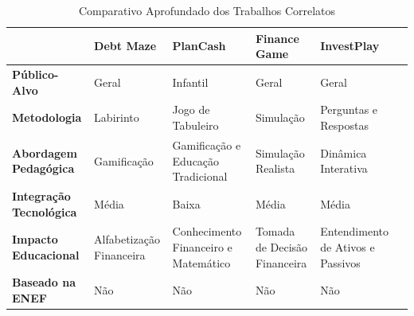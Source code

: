 \begin{table}[ht]
	\centering
	\renewcommand{\arraystretch}{1.3}
	\caption{Comparativo Aprofundado dos Trabalhos Correlatos}
	\label{tab:comparativo-trabalhos}
	\begin{tabular}{| L{2.5cm} | L{2.6cm} | L{2.6cm} | L{2.6cm} | L{2.6cm} | L{2.6cm} |}
		\hline
		\textbf{}                       & \textbf{Debt Maze}       & \textbf{PlanCash}                    & \textbf{Finance Game}        & \textbf{InvestPlay}               \\
		\hline
		\hline
		\textbf{Público-Alvo}           & Geral                    & Infantil                             & Geral                        & Geral                             \\
		\hline
		\textbf{Metodologia}            & Labirinto                & Jogo de Tabuleiro                    & Simulação                    & Perguntas e Respostas             \\
		\hline
		\textbf{Abordagem Pedagógica}   & Gamificação              & Gamificação e Educação Tradicional   & Simulação Realista           & Dinâmica Interativa               \\
		\hline
		\textbf{Integração Tecnológica} & Média                    & Baixa                                & Média                        & Média                             \\
		\hline
		\textbf{Impacto Educacional}    & Alfabetização Financeira & Conhecimento Financeiro e Matemático & Tomada de Decisão Financeira & Entendimento de Ativos e Passivos \\
		\hline
		\textbf{Baseado na ENEF}        & Não                      & Não                                  & Não                          & Não                               \\
		\hline
	\end{tabular}
	\vspace{2mm}
\end{table}
